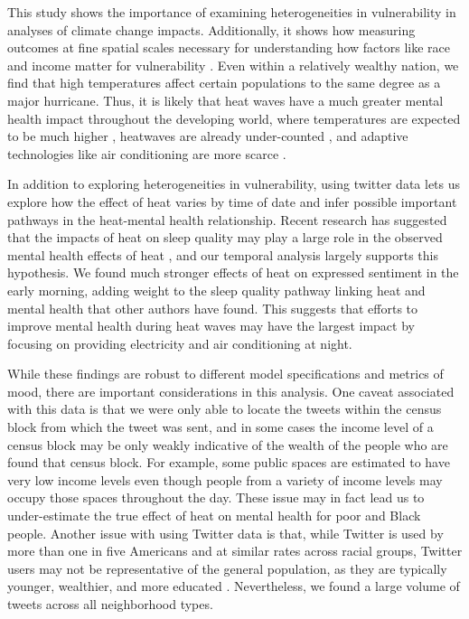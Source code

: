 \documentclass[fleqn,10pt]{wlscirep}
\begin{document}
This study shows the importance of examining heterogeneities in vulnerability in analyses of climate change impacts.  Additionally, it shows how measuring outcomes at fine spatial scales necessary for understanding how factors like race and income matter for vulnerability \cite{Tong2021}. Even within a relatively wealthy nation, we find that high temperatures affect certain populations to the same degree as a major hurricane. Thus, it is likely that heat waves have a much greater mental health impact throughout the developing world, where temperatures are expected to be much higher \cite{Raymond2020May}, heatwaves are already under-counted \cite{Harrington2020Sep}, and adaptive technologies like air conditioning are more scarce \cite{Biardeau2020Jan}.

In addition to exploring heterogeneities in vulnerability, using twitter data lets us explore how the effect of heat varies by time of date and infer possible important pathways in the heat-mental health relationship. Recent research has suggested that the impacts of heat on sleep quality may play a large role in the observed mental health effects of heat \cite{Obradovich2017May, Mullins2019Dec}, and our temporal analysis largely supports this hypothesis.  We found much stronger effects of heat on expressed sentiment in the early morning, adding weight to the sleep quality pathway linking heat and mental health that other authors have found.  This suggests that efforts to improve mental health during heat waves may have the largest impact by focusing on providing electricity and air conditioning at night.


While these findings are robust to different model specifications and metrics of mood, there are important considerations in this analysis.  One caveat associated with this data is that we were only able to locate the tweets within the census block from which the tweet was sent, and in some cases the income level of a census block may be only weakly indicative of the wealth of the people who are found that census block. For example, some public spaces are estimated to have very low income levels even though people from a variety of income levels may occupy those spaces throughout the day. These issue may in fact lead us to under-estimate the true effect of heat on mental health for poor and Black people. Another issue with using Twitter data is that, while Twitter is used by more than one in five Americans and at similar rates across racial groups, Twitter users may not be representative of the general population, as they are typically younger, wealthier, and more educated \cite{Pew2020Sep}. Nevertheless, we found a large volume of tweets across all neighborhood types.
\end{document}
